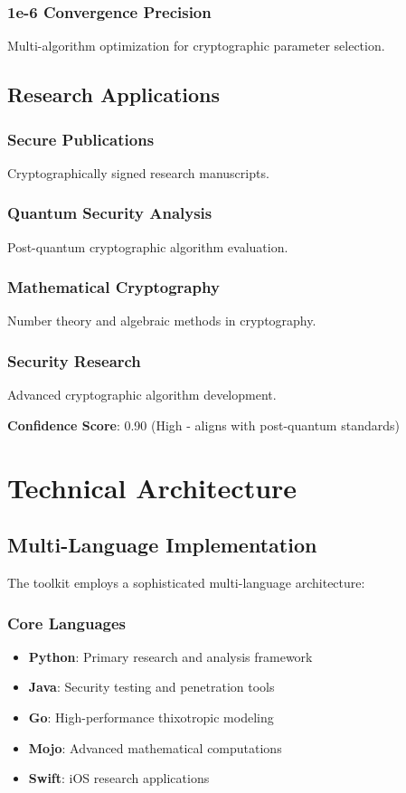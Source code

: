 \documentclass[11pt,a4paper]{article}
\begin{document}
\subsubsection{1e-6 Convergence Precision}
Multi-algorithm optimization for cryptographic parameter selection.

\subsection{Research Applications}

\subsubsection{Secure Publications}
Cryptographically signed research manuscripts.

\subsubsection{Quantum Security Analysis}
Post-quantum cryptographic algorithm evaluation.

\subsubsection{Mathematical Cryptography}
Number theory and algebraic methods in cryptography.

\subsubsection{Security Research}
Advanced cryptographic algorithm development.

\textbf{Confidence Score}: 0.90 (High - aligns with post-quantum standards)

\section{Technical Architecture}
\label{sec:architecture}

\subsection{Multi-Language Implementation}

The toolkit employs a sophisticated multi-language architecture:

\subsubsection{Core Languages}
\begin{itemize}
    \item \textbf{Python}: Primary research and analysis framework
    \item \textbf{Java}: Security testing and penetration tools
    \item \textbf{Go}: High-performance thixotropic modeling
    \item \textbf{Mojo}: Advanced mathematical computations
    \item \textbf{Swift}: iOS research applications
\end{itemize}
\end{document}
